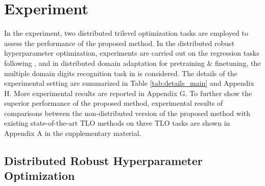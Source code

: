 \documentclass[letterpaper]{article}
\begin{document}
\section{Experiment}

In the experiment, two distributed trilevel optimization tasks are employed to assess the performance of the proposed method. In the distributed robust hyperparameter optimization, experiments are carried out on the regression tasks  following \cite{sato2021gradient}, and in distributed domain adaptation for pretraining $\&$ finetuning, the multiple domain digits recognition task in \cite{qian2019robust,wang2021discriminative} is considered. The details of the experimental setting are summarized in Table \ref{tab:details_main} and Appendix H. More experimental results are reported in Appendix G. To further show the superior performance of the proposed method, experimental results of comparisons between the non-distributed version of the proposed method with existing state-of-the-art TLO methods \cite{sato2021gradient,choe2022betty} on three TLO tasks are shown in Appendix A in the supplementary material.



\subsection{Distributed Robust Hyperparameter Optimization}
\end{document}
